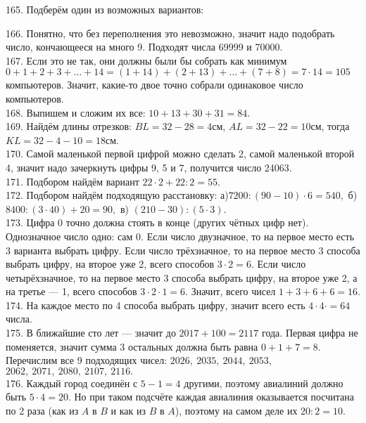 165. Подберём один из возможных вариантов:
\begin{center}
\begin{figure}[ht!]
\end{figure}
\end{center}
166. Понятно, что без переполнения это невозможно, значит надо подобрать число, кончающееся на много 9. Подходят числа 69999 и 70000.\\
167. Если это не так, они должны были бы собрать как минимум $0+1+2+3+\ldots+14=(1+14)+(2+13)+\ldots+(7+8)=7\cdot14=105$ компьютеров. Значит, какие-то двое точно собрали одинаковое число компьютеров.\\
168. Выпишем и сложим их все: $10+13+30+31=84.$\\
169. Найдём длины отрезков: $BL=32-28=4$см, $AL=32-22=10$см, тогда $KL=32-4-10=18$см.\\
170. Самой маленькой первой цифрой можно сделать 2, самой маленькой второй 4, значит надо зачеркнуть цифры 9, 5 и 7, получится число 24063.\\
171. Подбором найдём вариант $22\cdot2+22:2=55.$\\
172. Подбором найдём подходящую расстановку: а)$7200:(90-10)\cdot6=540,$ б) $8400:(3\cdot40)+20=90,$ в) $(210-30):(5\cdot3).$\\
173. Цифра 0 точно должна стоять в конце (других чётных цифр нет). Однозначное число одно: сам 0. Если число двузначное, то на первое место есть 3 варианта выбрать цифру. Если число трёхзначное, то на первое место 3 способа выбрать цифру, на второе уже 2, всего способов $3\cdot2=6.$ Если число четырёхзначное, то на первое место 3 способа выбрать цифру, на второе уже 2, а на третье --- 1, всего способов $3\cdot2\cdot1=6.$ Значит, всего чисел $1+3+6+6=16.$\\
174. На каждое место по 4 способа выбрать цифру, значит всего есть $4\cdot4\cdot=64$ числа.\\
175. В ближайшие сто лет --- значит до $2017+100=2117$ года. Первая цифра не поменяется, значит сумма 3 остальных должна быть равна $0+1+7=8.$ Перечислим все 9 подходящих чисел: $2026,\ 2035,\ 2044,\ 2053,$\\$2062,\ 2071,\ 2080,\ 2107,\ 2116.$\\
176. Каждый город соединён с $5-1=4$ другими, поэтому авиалиний должно быть $5\cdot4=20.$ Но при таком подсчёте каждая авиалиния оказывается посчитана по 2 раза (как из $A$ в $B$ и как из $B$ в $A$), поэтому на самом деле их $20:2=10.$\\
